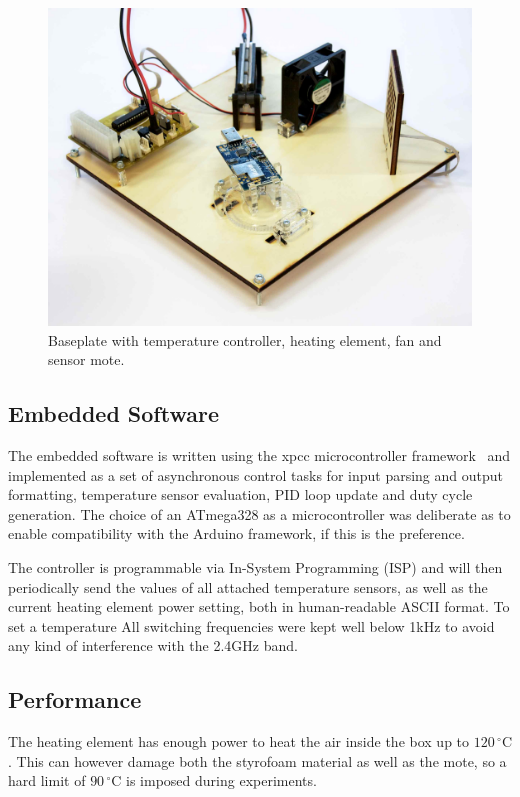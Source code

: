 \begin{figure}[hb]
	\centering
    \includegraphics[width=1\columnwidth]{figures/temperature_box}
	\caption{Baseplate with temperature controller, heating element, fan and sensor mote.}
    \label{fig:box_hardware_picture}
\end{figure}


\subsection{Embedded Software}

The embedded software is written using the xpcc microcontroller framework~\cite{xpcc.io} and implemented as a set of asynchronous control tasks for input parsing and output formatting, temperature sensor evaluation, PID loop update and duty cycle generation.
The choice of an ATmega328 as a microcontroller was deliberate as to enable compatibility with the Arduino framework, if this is the preference.

The controller is programmable via In-System Programming (ISP) and will then periodically send the values of all attached temperature sensors, as well as the current heating element power setting, both in human-readable ASCII format.
To set a temperature
All switching frequencies were kept well below 1kHz to avoid any kind of interference with the 2.4GHz band.


\subsection{Performance}

The heating element has enough power to heat the air inside the box up to $120\,^{\circ}\mathrm{C}$.
This can however damage both the styrofoam material as well as the mote, so a hard limit of $90\,^{\circ}\mathrm{C}$ is imposed during experiments.

